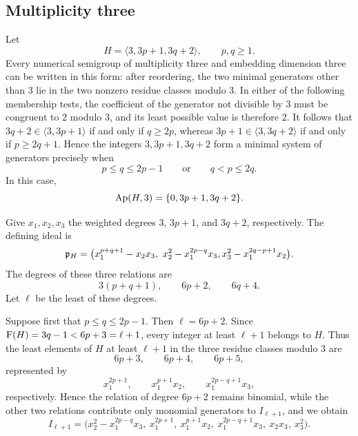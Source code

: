 \subsection{Multiplicity three}
\label{subsec:multiplicity-three}
Let
\[
 H=\langle 3,3p+1,3q+2\rangle,\qquad p,q\geq1.
\]
Every numerical semigroup of multiplicity three and embedding dimension
three can be written in this form: after reordering, the two minimal
generators other than $3$ lie in the two nonzero residue classes modulo $3$.
In either of the following membership tests, the coefficient of the generator
not divisible by $3$ must be congruent to $2$ modulo $3$, and its least
possible value is therefore $2$.  It follows that
$3q+2\in\langle3,3p+1\rangle$ if and only if $q\geq2p$, whereas
$3p+1\in\langle3,3q+2\rangle$ if and only if $p\geq2q+1$.  Hence the
integers $3,3p+1,3q+2$ form a minimal system of generators precisely when
\[
 p\leq q\leq2p-1
 \qquad\text{or}\qquad
 q<p\leq2q.
\]
In this case,
\[
 \operatorname{Ap}(H,3)=\{0,3p+1,3q+2\}.
\]

Give $x_1,x_2,x_3$ the weighted degrees $3$, $3p+1$, and $3q+2$, respectively.
The defining ideal is
\[
 \fkp_H=\bigl(x_1^{p+q+1}-x_2x_3,\ x_2^2-x_1^{2p-q}x_3,
                    x_3^2-x_1^{2q-p+1}x_2\bigr).
\]
The degrees of these three relations are
\[
 3(p+q+1),\qquad 6p+2,\qquad 6q+4.
\]
Let $\ell$ be the least of these degrees.


Suppose first that $p\leq q \le 2p-1$.  
Then $\ell = 6p+2$.
Since $\operatorname{F}(H)=3q-1 < 6p+3 = \ell + 1$, 
every integer at least $\ell + 1$ belongs to $H$.  Thus the least elements of $H$
at least $\ell + 1$ in the three residue classes modulo $3$ are
\[
 6p+3,\qquad 6p+4,\qquad 6p+5,
\]
represented by
\[
 x_1^{2p+1},\qquad x_1^{p+1}x_2,\qquad x_1^{2p-q+1}x_3,
\]
respectively.  Hence the relation of degree $6p+2$ remains binomial, while
the other two relations contribute only monomial generators to $I_{\ell+1}$, and we
obtain
\[
 I_{\ell+1}=\bigl(x_2^2-x_1^{2p-q}x_3,\ x_1^{2p+1},\ x_1^{p+1}x_2,\
             x_1^{2p-q+1}x_3,\ x_2x_3,\ x_3^2\bigr).
\]

